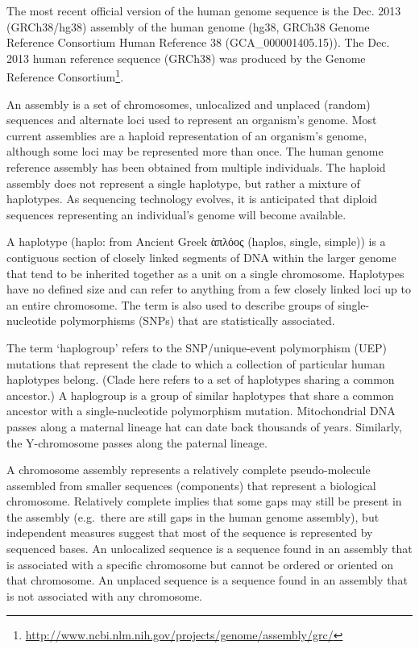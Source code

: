 \documentclass[]{book}
\let\rmarkdownfootnote\footnote%
\def\footnote{\protect\rmarkdownfootnote}
\renewcommand{\href}[2]{#2\footnote{\url{#1}}}
\begin{document}
The most recent official version of the human genome sequence is the
Dec. 2013 (GRCh38/hg38) assembly of the human genome (hg38, GRCh38
Genome Reference Consortium Human Reference 38 (GCA\_000001405.15)). The
Dec. 2013 human reference sequence (GRCh38) was produced by the
\href{http://www.ncbi.nlm.nih.gov/projects/genome/assembly/grc/}{Genome
Reference Consortium}.

An assembly is a set of chromosomes, unlocalized and unplaced (random)
sequences and alternate loci used to represent an organism's genome.
Most current assemblies are a haploid representation of an organism's
genome, although some loci may be represented more than once. The human
genome reference assembly has been obtained from multiple individuals.
The haploid assembly does not represent a single haplotype, but rather a
mixture of haplotypes. As sequencing technology evolves, it is
anticipated that diploid sequences representing an individual's genome
will become available.

A haplotype (haplo: from Ancient Greek ὰπλόος (haplos, single, simple))
is a contiguous section of closely linked segments of DNA within the
larger genome that tend to be inherited together as a unit on a single
chromosome. Haplotypes have no defined size and can refer to anything
from a few closely linked loci up to an entire chromosome. The term is
also used to describe groups of single-nucleotide polymorphisms (SNPs)
that are statistically associated.

The term `haplogroup' refers to the SNP/unique-event polymorphism (UEP)
mutations that represent the clade to which a collection of particular
human haplotypes belong. (Clade here refers to a set of haplotypes
sharing a common ancestor.) A haplogroup is a group of similar
haplotypes that share a common ancestor with a single-nucleotide
polymorphism mutation. Mitochondrial DNA passes along a maternal lineage
hat can date back thousands of years. Similarly, the Y-chromosome passes
along the paternal lineage.

A chromosome assembly represents a relatively complete pseudo-molecule
assembled from smaller sequences (components) that represent a
biological chromosome. Relatively complete implies that some gaps may
still be present in the assembly (e.g.~there are still gaps in the human
genome assembly), but independent measures suggest that most of the
sequence is represented by sequenced bases. An unlocalized sequence is a
sequence found in an assembly that is associated with a specific
chromosome but cannot be ordered or oriented on that chromosome. An
unplaced sequence is a sequence found in an assembly that is not
associated with any chromosome.
\end{document}
